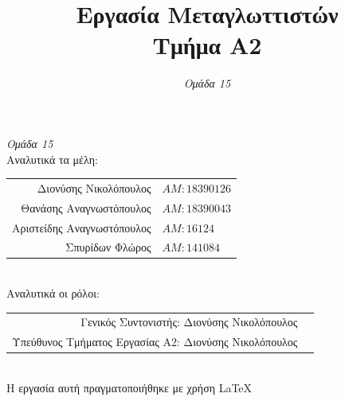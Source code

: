 \documentclass[14pt]{extarticle}
\title{\bf Εργασία Μεταγλωττιστών \\ Τμήμα Α2}
\author{
  \emph{Ομάδα 15}
}
\begin{document}
\begin{titlepage}
  \maketitle
  \begin{center}
    \large \emph{Ομάδα 15}
    \\
    Αναλυτικά τα μέλη:
\vspace{5mm}
  \begin{tabular}{r l}
    \\Διονύσης Νικολόπουλος & $AM: 18390126$
    \\Θανάσης Αναγνωστόπουλος & $AM: 18390043$
    \\Αριστείδης Αναγνωστόπουλος & $AM: 16124$
    \\Σπυρίδων Φλώρος & $AM: 141084$
  \end{tabular}
\vspace{5mm}
    \\
    Αναλυτικά οι ρόλοι:
    \\
\vspace{5mm}
  \begin{tabular}{r l}
    \small Γενικός Συντονιστής:   Διονύσης Νικολόπουλος
    \\
    \small Υπεύθυνος Τμήματος Εργασίας Α2: Διονύσης Νικολόπουλος
  \end{tabular}
  \\
\vspace*{\fill}
    \footnotesize{Η εργασία αυτή πραγματοποιήθηκε με χρήση \LaTeX}
  \end{center}
\end{titlepage}

\tableofcontents
\clearpage
\end{document}
